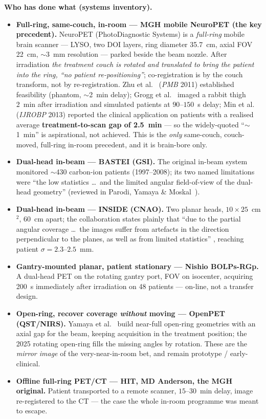 \documentclass[11pt]{article}
\begin{document}
\medskip
\noindent\textbf{Who has done what (systems inventory).}
\begin{itemize}
\item \textbf{Full-ring, same-couch, in-room --- MGH mobile NeuroPET (the key
  precedent).} NeuroPET (PhotoDiagnostic Systems) is a \emph{full-ring} mobile
  brain scanner --- LYSO, two DOI layers, ring diameter 35.7~cm, axial FOV
  22~cm, $\sim$3~mm resolution --- parked beside the beam nozzle. After
  irradiation \emph{the treatment couch is rotated and translated to bring the
  patient into the ring, ``no patient re-positioning''}; co-registration is by
  the couch transform, not by re-registration. Zhu et al.~\cite{zhu2011} (\emph{PMB}
  2011) established feasibility (phantom, $\sim$2~min delay); Grogg et
  al.~\cite{grogg2013} imaged a rabbit thigh 2~min after irradiation and
  simulated patients at $90$--$150$~s delay; Min et al.~\cite{min2013} (\emph{IJROBP}
  2013) reported the clinical application on patients with a realised average
  \textbf{treatment-to-scan gap of 2.5~min} --- so the widely-quoted ``$\sim$1~min''
  is aspirational, not achieved. This is the \emph{only} same-couch, couch-moved,
  full-ring in-room precedent, and it is brain-bore only.
\item \textbf{Dual-head in-beam --- BASTEI (GSI).} The original in-beam system
  monitored $\sim$430 carbon-ion patients (1997--2008); its two named limitations
  were ``the low statistics \dots\ and the limited angular field-of-view of the
  dual-head geometry'' (reviewed in Parodi, Yamaya \& Moskal~\cite{parodiyamaya2023}).
\item \textbf{Dual-head in-beam --- INSIDE (CNAO).} Two planar heads,
  $10\times25$~cm$^2$, 60~cm apart; the collaboration states plainly that ``due to
  the partial angular coverage \dots\ the images suffer from artefacts in the
  direction perpendicular to the planes, as well as from limited statistics''
  \cite{moglioni2022}, reaching patient $\sigma = 2.3$--$2.5$~mm.
\item \textbf{Gantry-mounted planar, patient stationary --- Nishio BOLPs-RGp.}
  A dual-head PET on the rotating gantry port, FOV on isocenter, acquiring 200~s
  immediately after irradiation on 48 patients \cite{nishio2010} --- on-line, not
  a transfer design.
\item \textbf{Open-ring, recover coverage \emph{without} moving --- OpenPET
  (QST/NIRS).} Yamaya et al.~\cite{yamaya2011} build near-full open-ring
  geometries with an axial gap for the beam, keeping acquisition in the treatment
  position; the 2025 rotating open-ring \cite{rotatingopenring2025} fills the
  missing angles by rotation. These are the \emph{mirror image} of the
  very-near-in-room bet, and remain prototype / early-clinical.
\item \textbf{Offline full-ring PET/CT --- HIT, MD Anderson, the MGH original.}
  Patient transported to a remote scanner, $15$--$30$~min delay, image
  re-registered to the CT --- the case the whole in-room programme was meant to
  escape.
\end{itemize}
\end{document}
